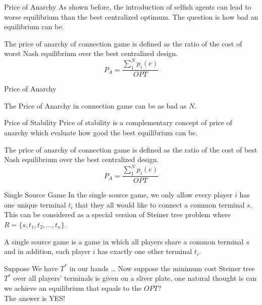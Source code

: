 \documentclass[11pt,aspectratio=169]{beamer}
\begin{document}
\begin{frame}{Price of Anarchy}
    As shown before, the introduction of selfish agents can lead to worse equilibrium than the best centralized optimum. The question is how bad an equilibrium can be.

    \begin{definition} The price of anarchy of connection game is defined as the ratio of the cost of worst Nash equilibrium over the best centralized design.
        \[P_A = \dfrac{\sum_{1}^{N}p_i(e) }{OPT}\]
    \end{definition}
   
\end{frame}

\begin{frame}{Price of Anarchy}
    \begin{lemma}
        The Price of Anarchy in connection game can be as bad as \(N\).
    \end{lemma}
\end{frame}

\begin{frame}{Price of Stability}
    Price of stability is a complementary concept of price of anarchy which evaluate how good the best equilibrium can be. 

\begin{definition} 
    The price of anarchy of connection game is defined as the ratio of the cost of best Nash equilibrium over the best centralized design.
    \[P_A = \dfrac{\sum_{1}^{N}p_i(e) }{OPT}\]
    \end{definition}
\end{frame}

\begin{frame}{Single Source Game}
    In the single source game, we only allow every player \(i\) has one unique terminal \(t_i\) that they all would like to connect a common terminal \(s\). This can be considered as a special version of Steiner tree problem where \(R = \{s,t_1,t_2,...,t_n\}\). 
\vspace{10pt}
\begin{definition}
	A single source game is a game in which all players share a common terminal \(s\) and in addition, each player \(i\) has exactly one other terminal \(t_i\).
\end{definition}
\end{frame}

\begin{frame}{Suppose We have $T^*$ in our hands \dots}
Now suppose the minimum cost Steiner tree \(T^*\) over all players' terminals is given on a sliver plate, one natural thought is can we achieve an equilibrium that equals to the \(OPT\)?  \\
\vspace{10pt}
The answer is YES!
\end{frame}
\end{document}
